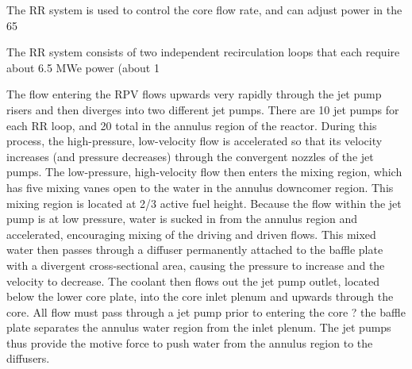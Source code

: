 \documentclass[10pt]{article}
\begin{document}
The RR system is used to control the core flow rate, and can adjust power in the 65%

The RR system consists of two independent recirculation loops that each require about 6.5 MWe power (about 1%

The flow entering the RPV flows upwards very rapidly through the jet pump risers and then diverges into two different jet pumps. There are 10 jet pumps for each RR loop, and 20 total in the annulus region of the reactor. During this process, the high-pressure, low-velocity flow is accelerated so that its velocity increases (and pressure decreases) through the convergent nozzles of the jet pumps. The low-pressure, high-velocity flow then enters the mixing region, which has five mixing vanes open to the water in the annulus downcomer region. This mixing region is located at 2/3 active fuel height. Because the flow within the jet pump is at low pressure, water is sucked in from the annulus region and accelerated, encouraging mixing of the driving and driven flows. This mixed water then passes through a diffuser permanently attached to the baffle plate with a divergent cross-sectional area, causing the pressure to increase and the velocity to decrease. The coolant then flows out the jet pump outlet, located below the lower core plate, into the core inlet plenum and upwards through the core. All flow must pass through a jet pump prior to entering the core ? the baffle plate separates the annulus water region from the inlet plenum. The jet pumps thus provide the motive force to push water from the annulus region to the diffusers. 
\end{document}

